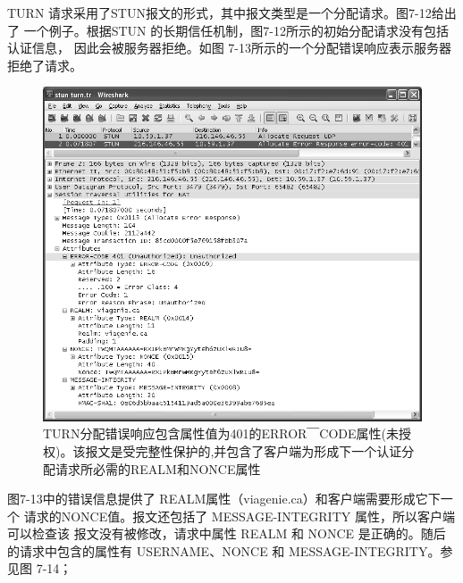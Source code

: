 TURN 请求采用了STUN报文的形式，其中报文类型是一个分配请求。图7-12给出了
一个例子。根据STUN 的长期信任机制，图7-12所示的初始分配请求没有包括认证信息，
因此会被服务器拒绝。如图 7-13所示的一个分配错误响应表示服务器拒绝了请求。

\begin{figure}[H]
    \centering
	\includegraphics[scale=0.5]{imgs/7/7-13.png}
	\caption{TURN分配错误响应包含属性值为401的ERROR￣CODE属性(未授权)。该报文是受完整性保护的,并包含了客户端为形成下一个认证分配请求所必需的REALM和NONCE属性}
\end{figure}

图7-13中的错误信息提供了 REALM属性（viagenie.ca）和客户端需要形成它下一个
请求的NONCE值。报文还包括了 MESSAGE-INTEGRITY 属性，所以客户端可以检查该
报文没有被修改，请求中属性 REALM 和 NONCE 是正确的。随后的请求中包含的属性有
USERNAME、NONCE 和 MESSAGE-INTEGRITY。参见图 7-14；

